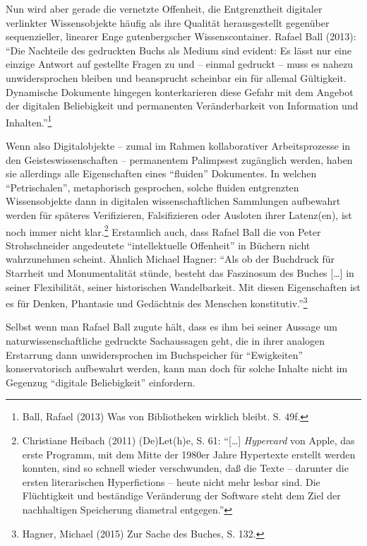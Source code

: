\documentclass[a4paper,
fontsize=11pt,
oneside,
numbers=noperiodatend,
parskip=half-,
bibliography=totoc,
final
]{scrartcl}
\begin{document}
Nun wird aber gerade die vernetzte Offenheit, die Entgrenztheit
digitaler verlinkter Wissensobjekte häufig als ihre Qualität
herausgestellt gegenüber sequenzieller, linearer Enge gutenbergscher
Wissenscontainer. Rafael Ball (2013): \enquote{Die Nachteile des
gedruckten Buchs als Medium sind evident: Es lässt nur eine einzige
Antwort auf gestellte Fragen zu und -- einmal gedruckt -- muss es nahezu
unwidersprochen bleiben und beansprucht scheinbar ein für allemal
Gültigkeit. Dynamische Dokumente hingegen konterkarieren diese Gefahr
mit dem Angebot der digitalen Beliebigkeit und permanenten
Veränderbarkeit von Information und Inhalten.}\footnote{Ball, Rafael
  (2013) Was von Bibliotheken wirklich bleibt. S. 49f.}

Wenn also Digitalobjekte -- zumal im Rahmen kollaborativer
Arbeitsprozesse in den Geisteswissenschaften -- permanentem Palimpsest
zugänglich werden, haben sie allerdings alle Eigenschaften eines
\enquote{fluiden} Dokumentes. In welchen \enquote{Petrischalen},
metaphorisch gesprochen, solche fluiden entgrenzten Wissensobjekte dann
in digitalen wissenschaftlichen Sammlungen aufbewahrt werden für
späteres Verifizieren, Falsifizieren oder Ausloten ihrer Latenz(en), ist
noch immer nicht klar.\footnote{Christiane Heibach (2011) (De)Let(h)e,
  S. 61: \enquote{{[}\ldots{}{]} \emph{Hypercard} von Apple, das erste
  Programm, mit dem Mitte der 1980er Jahre Hypertexte erstellt werden
  konnten, sind so schnell wieder verschwunden, daß die Texte --
  darunter die ersten literarischen Hyperfictions -- heute nicht mehr
  lesbar sind. Die Flüchtigkeit und beständige Veränderung der Software
  steht dem Ziel der nachhaltigen Speicherung diametral entgegen.}}
Erstaunlich auch, dass Rafael Ball die von Peter Strohschneider
angedeutete \enquote{intellektuelle Offenheit} in Büchern nicht
wahrzunehmen scheint. Ähnlich Michael Hagner: \enquote{Als ob der
Buchdruck für Starrheit und Monumentalität stünde, besteht das
Faszinosum des Buches {[}\ldots{}{]} in seiner Flexibilität, seiner
historischen Wandelbarkeit. Mit diesen Eigenschaften ist es für Denken,
Phantasie und Gedächtnis des Menschen konstitutiv.}\footnote{Hagner,
  Michael (2015) Zur Sache des Buches, S. 132.}

Selbst wenn man Rafael Ball zugute hält, dass es ihm bei seiner Aussage
um naturwissenschaftliche gedruckte Sachaussagen geht, die in ihrer
analogen Erstarrung dann unwidersprochen im Buchspeicher für
\enquote{Ewigkeiten} konservatorisch aufbewahrt werden, kann man doch
für solche Inhalte nicht im Gegenzug \enquote{digitale Beliebigkeit}
einfordern.
\end{document}
